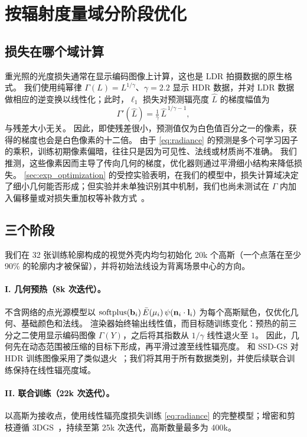 \section{按辐射度量域分阶段优化}
\label{sec:optimization}

\subsection{损失在哪个域计算}
\label{sec:lossdomain}
重光照的光度损失通常在显示编码图像上计算，这也是 LDR 拍摄数据的原生格式。
我们使用纯幂律 $\Gamma(L)=L^{1/\gamma}$、$\gamma=2.2$ 显示 HDR 数据，并对 LDR 数据做相应的逆变换以线性化；此时，$\ell_1$ 损失对预测辐亮度 $\hat L$ 的梯度幅值为
\begin{equation}
  \Gamma'(\hat L)=\tfrac{1}{\gamma}\,\hat L^{\,1/\gamma-1},
  \label{eq:slope}
\end{equation}
与残差大小无关。
因此，即使残差很小，预测值仅为白色值百分之一的像素，获得的梯度也会是白色像素的十二倍。
由于 \cref{eq:radiance} 的预测是多个可学习因子的乘积，训练初期像素偏暗，往往只是因为可见性、法线或材质尚不准确。
我们推测，这些像素因而主导了传向几何的梯度，优化器则通过平滑细小结构来降低损失。
\cref{sec:exp_optimization} 的受控实验表明，在我们的模型中，损失计算域决定了细小几何能否形成；但实验并未单独识别其中机制，我们也尚未测试在 $\Gamma$ 内加入偏移量或对损失重加权等补救方式~\cite{mildenhall2022nerf}。

\subsection{三个阶段}
\label{sec:stages}
我们在 32 张训练轮廓构成的视觉外壳内均匀初始化 20k 个高斯（一个点落在至少 90\% 的轮廓内才被保留），并将初始法线设为背离场景中心的方向。

\paragraph{I. 几何预热（8k 次迭代）。}
不含网络的点光源模型以 $\operatorname{softplus}(\mathbf{b}_i)\,\bar E(\mu_i)\,\psi(\mathbf{n}_i\cdot\mathbf{l}_i)$ 为每个高斯赋色，仅优化几何、基础颜色和法线。
渲染器始终输出线性值，而目标随训练变化：预热的前三分之二使用显示编码图像 $\Gamma(Y)$，之后将其指数从 $1/\gamma$ 线性退火至 $1$。
因此，几何先在动态范围被压缩的目标下形成，再平滑过渡至线性辐亮度。
\gsthree 和 SSD-GS 对 HDR 训练图像采用了类似退火~\cite{bi2024gs3,zheng2026ssdgs}；我们将其用于所有数据类别，并使后续联合训练保持在线性辐亮度域。

\paragraph{II. 联合训练（22k 次迭代）。}
以高斯为接收点，使用线性辐亮度损失训练 \cref{eq:radiance} 的完整模型；增密和剪枝遵循 3DGS~\cite{kerbl20233d}，持续至第 25k 次迭代，高斯数量最多为 400k。

